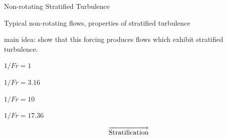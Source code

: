 \documentclass[aspecttatio=169]{beamer}
\begin{document}
\begin{frame}{Non-rotating Stratified Turbulence}
    \centering

    Typical non-rotating flows, properties of stratified turbulence

    main idea: show that this forcing produces flows which exhibit stratified
    turbulence. 

        \centering
        $1/Fr = 1$
        \vspace{2pt}
        
    \emp
    \hspace{1pt}
        \centering
        $1/Fr = 3.16$
        \vspace{2pt}
        
    \emp
    \hspace{1pt}
        \centering
        $1/Fr = 10$
        \vspace{2pt}
        
    \emp
    \hspace{1pt}
        \centering
        $1/Fr = 17.36$
        \vspace{2pt}
        
    \emp
    \[\overrightarrow{\rm Stratification}\]
\end{frame}
\end{document}
